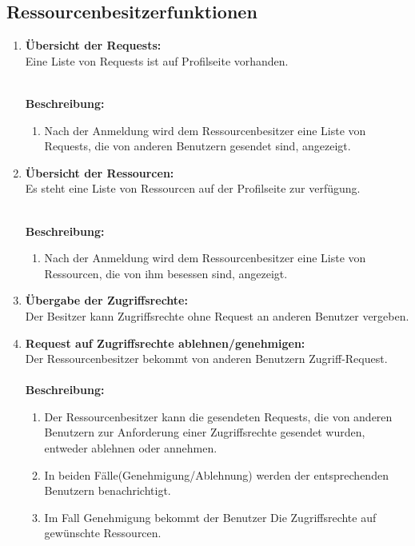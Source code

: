 \documentclass[parskip=full,11pt]{scrartcl}
\def\threedigits#1{%
  \ifnum#1<10 0\fi
  \ifnum#1<1 0\fi
  \number#1}
\begin{document}
\subsection{Ressourcenbesitzerfunktionen}
\begin{enumerate}[label={\textbf{/F\protect\threedigits{\theenumi}0/}}, leftmargin=*, resume]
\item \label{FARB1} \textbf{Übersicht der Requests:}\\
Eine Liste von Requests ist auf Profilseite vorhanden.\\\

\textbf{Beschreibung:}\\
\begin{enumerate}[label=(\arabic*), leftmargin=*]
\item Nach der Anmeldung wird dem Ressourcenbesitzer eine Liste von Requests, die von anderen Benutzern gesendet sind, angezeigt.  
\end{enumerate}
\item \label{FARB2} \textbf{Übersicht der Ressourcen:}\\
Es steht eine Liste von Ressourcen auf der Profilseite zur verfügung.\\\

\textbf{Beschreibung:}\\
\begin{enumerate}[label=(\arabic*), leftmargin=*]
\item Nach der Anmeldung wird dem Ressourcenbesitzer eine Liste von Ressourcen, die von ihm besessen sind, angezeigt.  
\end{enumerate}

\item \label{FARB3} \textbf {Übergabe der Zugriffsrechte:}\\ 
Der Besitzer kann Zugriffsrechte ohne Request an anderen Benutzer vergeben.

\item \label{FARB4} \textbf {Request auf Zugriffsrechte ablehnen/genehmigen:}\\ 
Der Ressourcenbesitzer bekommt von anderen Benutzern Zugriff-Request. \\\\

\textbf{Beschreibung:}\\
\begin{enumerate}[label=(\arabic*), leftmargin=*]
\item Der Ressourcenbesitzer kann die gesendeten Requests, die von anderen Benutzern zur Anforderung einer Zugriffsrechte gesendet wurden, entweder ablehnen oder annehmen.
\item In beiden Fälle(Genehmigung/Ablehnung) werden der entsprechenden Benutzern benachrichtigt.
\item Im Fall Genehmigung bekommt der Benutzer Die Zugriffsrechte auf  gewünschte Ressourcen.
\end{enumerate}


\end{enumerate}
\end{document}
